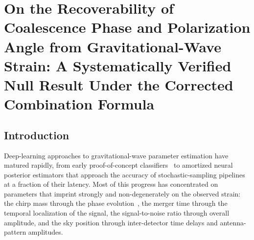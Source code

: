 \usepackage{geometry}
\usepackage{graphicx}
\usepackage{amssymb}
\usepackage{amsfonts}
\usepackage{booktabs}
\usepackage{amsopn}
\usepackage{amsmath}
\usepackage{amstext}

\graphicspath{{../}{../diagnostic_output/}{../analysis_output/}{../bootstrap_output/}{../snr_output/}{../inclination_output/}{../perturbation_trace_output/}{../rose_plot_output/}{../sky_mollweide_output/}}


\chapter{On the Recoverability of Coalescence Phase and Polarization Angle from Gravitational-Wave Strain: A Systematically Verified Null Result Under the Corrected Combination Formula}
\label{ch:phic-psi-degeneracy-redo}


\section{Introduction}
\label{sec:phicpsi:intro}

Deep-learning approaches to gravitational-wave parameter estimation have matured rapidly, from early proof-of-concept classifiers~\cite{george2018deep} to amortized neural posterior estimators that approach the accuracy of stochastic-sampling pipelines~\cite{gabbard2022vitamin,dax2021dingo} at a fraction of their latency.
Most of this progress has concentrated on parameters that imprint strongly and non-degenerately on the observed strain: the chirp mass through the phase evolution~\cite{cutler1994gw}, the merger time through the temporal localization of the signal, the signal-to-noise ratio through overall amplitude, and the sky position through inter-detector time delays and antenna-pattern amplitudes.

